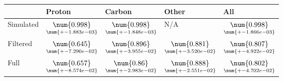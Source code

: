\begin{tabular}{lllll}
\toprule
{} &                                              Proton &                                              Carbon &                                               Other &                                                 All \\
\midrule
Simulated &  $\underset{\num{+- 1.883e-03 }  }{\num{ 0.998 } }$ &  $\underset{\num{+- 1.848e-03 }  }{\num{ 0.998 } }$ &  N/A &  $\underset{\num{+- 1.866e-03 }  }{\num{ 0.998 } }$ \\
Filtered  &  $\underset{\num{+- 7.290e-02 }  }{\num{ 0.645 } }$ &  $\underset{\num{+- 3.955e-02 }  }{\num{ 0.896 } }$ &  $\underset{\num{+- 3.520e-02 }  }{\num{ 0.881 } }$ &  $\underset{\num{+- 4.922e-02 }  }{\num{ 0.807 } }$ \\
Full      &  $\underset{\num{+- 8.574e-02 }  }{\num{ 0.657 } }$ &  $\underset{\num{+- 2.983e-02 }  }{\num{ 0.86 } }$ &  $\underset{\num{+- 2.551e-02 }  }{\num{ 0.888 } }$ &  $\underset{\num{+- 4.702e-02 }  }{\num{ 0.802 } }$ \\
\bottomrule
\end{tabular}
